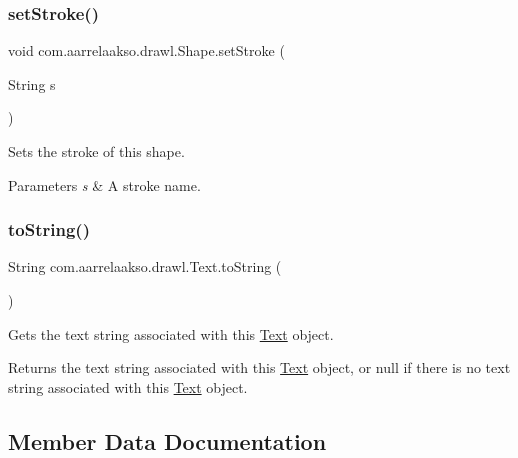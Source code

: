 \subsubsection{\texorpdfstring{set\+Stroke()}{setStroke()}}
{\footnotesize\ttfamily void com.\+aarrelaakso.\+drawl.\+Shape.\+set\+Stroke (\begin{DoxyParamCaption}\item[{String}]{s }\end{DoxyParamCaption})\hspace{0.3cm}{\ttfamily [inherited]}}



Sets the stroke of this shape. 


\begin{DoxyParams}{Parameters}
{\em s} & A stroke name. \\
\hline
\end{DoxyParams}
\mbox{\label{classcom_1_1aarrelaakso_1_1drawl_1_1_text_aaded65428b035e05b91e65f21808b434}} 
\subsubsection{\texorpdfstring{to\+String()}{toString()}}
{\footnotesize\ttfamily String com.\+aarrelaakso.\+drawl.\+Text.\+to\+String (\begin{DoxyParamCaption}{ }\end{DoxyParamCaption})}



Gets the text string associated with this \hyperlink{classcom_1_1aarrelaakso_1_1drawl_1_1_text}{Text} object. 

\begin{DoxyReturn}{Returns}
the text string associated with this \hyperlink{classcom_1_1aarrelaakso_1_1drawl_1_1_text}{Text} object, or {\ttfamily null} if there is no text string associated with this \hyperlink{classcom_1_1aarrelaakso_1_1drawl_1_1_text}{Text} object. 
\end{DoxyReturn}


\subsection{Member Data Documentation}
\mbox{\label{classcom_1_1aarrelaakso_1_1drawl_1_1_text_a94bf15b06c72349f5d5a1bfc56496685}} 

